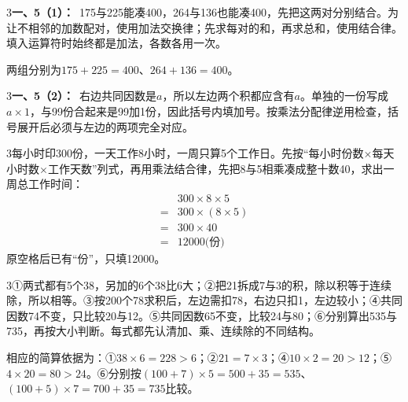\documentclass[multi=snippet,border={5bp 20bp 5bp 5bp}]{standalone}
\newenvironment{snippet}[3]{\begin{minipage}{#1bp}\color{answerred}\fontsize{#2}{#3}\selectfont\raggedright}{\end{minipage}}
\begin{document}
\begin{snippet}{505}{11.5}{14}\begin{multicols}{3}\raggedcolumns \textbf{一、5（1）：}\ 175与225能凑400，264与136也能凑400，先把这两对分别结合。为让不相邻的加数配对，使用加法交换律；先求每对的和，再求总和，使用结合律。填入运算符时始终都是加法，各数各用一次。\par 两组分别为\(175+225=400\)\allowbreak 、\(264+136=400\)\allowbreak 。\end{multicols}\end{snippet}
\begin{snippet}{505}{11.5}{14}\begin{multicols}{3}\raggedcolumns \textbf{一、5（2）：}\ 右边共同因数是\(a\)\allowbreak ，所以左边两个积都应含有\(a\)\allowbreak 。单独的一份写成\(a\times1\)\allowbreak ，与99份合起来是99加1份，因此括号内填加号。按乘法分配律逆用检查，括号展开后必须与左边的两项完全对应。\end{multicols}\end{snippet}
\begin{snippet}{505}{11.5}{14}\begin{multicols}{3}\raggedcolumns 每小时印300份，一天工作8小时，一周只算5个工作日。先按“每小时份数\(\times\)\allowbreak 每天小时数\(\times\)\allowbreak 工作天数”列式，再用乘法结合律，先把8与5相乘凑成整十数40，求出一周总工作时间：\[\begin{aligned}&300\times8\times5\\={}&300\times(8\times5)\\={}&300\times40\\={}&12000\text{(份)}\end{aligned}\]原空格后已有“份”，只填12000。\end{multicols}\end{snippet}
\begin{snippet}{505}{11.5}{14}\begin{multicols}{3}\raggedcolumns ①两式都有5个38，另加的6个38比6大；②把21拆成7与3的积，除以积等于连续除，所以相等。③按200个78求积后，左边需扣78，右边只扣1，左边较小；④共同因数74不变，只比较20与12。⑤共同因数65不变，比较24与80；⑥分别算出535与735，再按大小判断。每式都先认清加、乘、连续除的不同结构。\par 相应的简算依据为：①\(38\times6=228>6\)\allowbreak ；②\(21=7\times3\)\allowbreak ；④\(10\times2=20>12\)\allowbreak ；⑤\(4\times20=80>24\)\allowbreak 。⑥分别按\((100+7)\times5=500+35=535\)\allowbreak 、\((100+5)\times7=700+35=735\)\allowbreak 比较。\end{multicols}\end{snippet}
\end{document}
